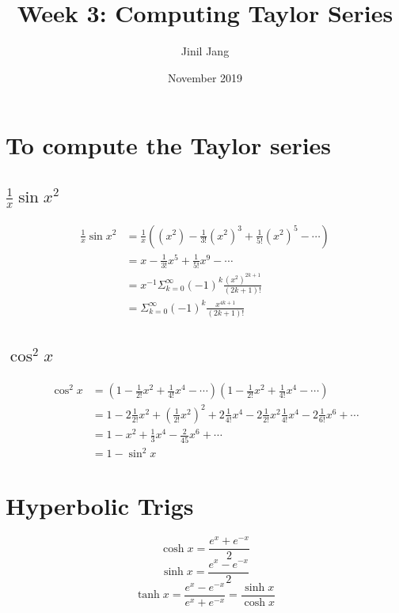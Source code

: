 \documentclass[a4paper,12pt]{article}
\title{Week 3: Computing Taylor Series}
\author{Jinil Jang }
\date{November 2019}
\begin{document}
\maketitle

\section{To compute the Taylor series}

\subsection{$\frac{1}{x}\sin{x^2}$}
\begin{equation}
\begin{split}
\frac{1}{x}\sin{x^2} & = \frac{1}{x}((x^2)-\frac{1}{3!}(x^2)^3 + \frac{1}{5!}(x^2)^5- \cdots) \\ 
 & = x - \frac{1}{3!}x^5 + \frac{1}{5!}x^9 - \cdots \\
 & = x^{-1}\Sigma_{k=0}^\infty (-1)^k\frac{(x^2)^{2k+1}}{(2k+1)!} \\
 & = \Sigma_{k=0}^\infty (-1)^k\frac{x^{4k+1}}{(2k+1)!}
\end{split}
\end{equation}

\subsection{$\cos^2{x}$}

\begin{equation}
\begin{split}
\cos^2{x} &= (1-\frac{1}{2!}x^2 + \frac{1}{4!}x^4 - \cdots)(1 - \frac{1}{2!}x^2 + \frac{1}{4!}x^4 - \cdots) \\
 & = 1 - 2\frac{1}{2!}x^2 + (\frac{1}{2!}x^2)^2 + 2\frac{1}{4!}x^4 - 2\frac{1}{2!}x^2\frac{1}{4!}x^4 - 2\frac{1}{6!}x^6 + \cdots \\
 & = 1 - x^2 + \frac{1}{3}x^4 - \frac{2}{45}x^6 + \cdots \\
 & = 1 - \sin^2{x}
\end{split}
\end{equation}

\section{Hyperbolic Trigs}

$$\cosh{x} = \frac{e^x + e^{-x}}{2}$$
$$\sinh{x} = \frac{e^x - e^{-x}}{2}$$
$$\tanh{x} = \frac{e^x - e^{-x}}{e^x + e^{-x}} = \frac{\sinh{x}}{\cosh{x}}$$
\end{document}
